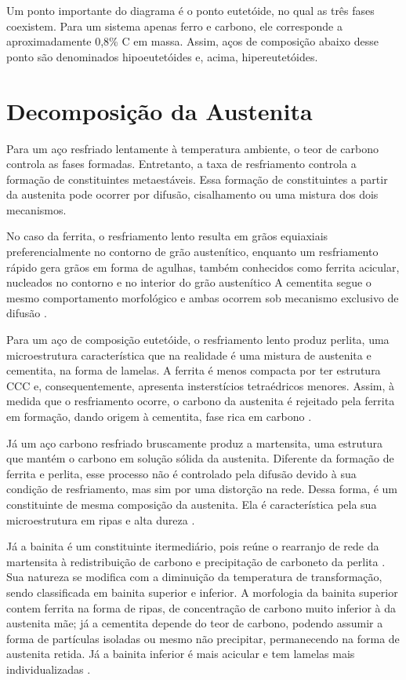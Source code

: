 \documentclass[brazil,tese,epusp]{usp}
\begin{document}
Um ponto importante do diagrama é o ponto eutetóide, no qual as três fases coexistem. Para um sistema apenas ferro e carbono, ele corresponde a aproximadamente 0,8\% C em massa. Assim, aços de composição abaixo desse ponto são denominados hipoeutetóides e, acima, hipereutetóides.

\section{Decomposição da Austenita}

Para um aço resfriado lentamente à temperatura ambiente, o teor de carbono controla as fases formadas. Entretanto, a taxa de resfriamento controla a formação de constituintes metaestáveis. Essa formação de constituintes a partir da austenita pode ocorrer por difusão, cisalhamento ou uma mistura dos dois mecanismos\cite{Honeycombe1982}.

No caso da ferrita, o resfriamento lento resulta em grãos equiaxiais preferencialmente no contorno de grão austenítico, enquanto um resfriamento rápido gera grãos em forma de agulhas, também conhecidos como ferrita acicular, nucleados no contorno e no interior do grão austenítico  \cite{Silva2010} %
A cementita segue o mesmo comportamento morfológico e ambas ocorrem sob mecanismo exclusivo de difusão \cite{Honeycombe1982}.

Para um aço de composição eutetóide, o resfriamento lento produz perlita, uma microestrutura característica que na realidade é uma mistura de austenita e cementita, na forma de lamelas. A ferrita é menos compacta por ter estrutura CCC e, consequentemente, apresenta insterstícios tetraédricos menores. Assim, à medida que o resfriamento ocorre, o carbono da austenita é rejeitado pela ferrita em formação, dando origem à cementita, fase rica em carbono \cite{Silva2010}.

Já um aço carbono resfriado bruscamente produz a martensita, uma estrutura que mantém o carbono em solução sólida da austenita. Diferente da formação de ferrita e perlita, esse processo não é controlado pela difusão devido à sua condição de resfriamento, mas sim por uma distorção na rede. Dessa forma, é um constituinte de mesma composição da austenita. Ela é característica pela sua microestrutura em ripas e alta dureza \cite{Honeycombe1982}.

Já a bainita é um constituinte itermediário, pois reúne o rearranjo de rede da martensita à redistribuição de carbono e precipitação de carboneto da perlita \cite{Totten2006}. Sua natureza se modifica com a diminuição da temperatura de transformação, sendo classificada em bainita superior e inferior. A morfologia da bainita superior contem ferrita na forma de ripas, de concentração de carbono muito inferior à da austenita mãe; já a cementita depende do teor de carbono, podendo assumir a forma de partículas isoladas ou mesmo não precipitar, permanecendo na forma de austenita retida. Já a bainita inferior é mais acicular e tem lamelas mais individualizadas \cite{Honeycombe1982}.
\end{document}
